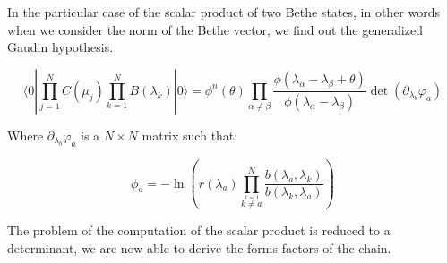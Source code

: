 \documentclass[12pt]{article}
\begin{document}



 
In the particular case of the scalar product of two Bethe states, in other words when we consider the norm of the Bethe vector, we find out the generalized Gaudin hypothesis\cite{BogIK93L}.


$$\langle 0|\prod_{j=1}^{N}C(\mu_{j})\prod_{k=1}^{N}B(\lambda_{k})|0\rangle =\phi^{n}(\theta)\prod_{\alpha\neq\beta}\frac{\phi(\lambda_{\alpha}-\lambda_{\beta}+\theta)}{\phi(\lambda_{\alpha}-\lambda_{\beta})}\det(\partial_{\lambda_{b}}\varphi_{a})$$


Where $\partial_{\lambda_{b}}\varphi_{a}$ is a $N \times N$ matrix such that:

\begin{equation}
\phi_{a}=-\ln\left(r(\lambda_{a})\prod_{\overset{k=1}{k\neq a}}^{N} \frac{b(\lambda_{a},\lambda_{k})}{b(\lambda_{k},\lambda_{a})}\right)
\end{equation}

The problem of the computation of the scalar product is reduced to a determinant, we are now able to derive the forms factors of the chain.
\end{document}
